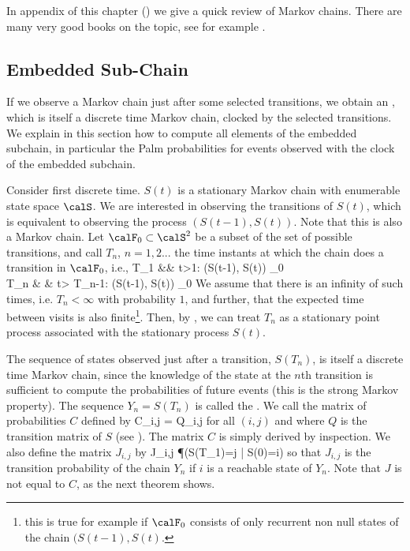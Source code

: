 In appendix of this chapter () we give a quick
review of Markov chains. There are many very good books on the
topic, see for example \cite{Cinlar,ycart-2000,bremaud1999mcg}.


\subsection{Embedded Sub-Chain}

If we observe a Markov chain just after some selected transitions,
we obtain an , which is itself a discrete
time Markov chain, clocked by the selected transitions. We explain
in this section how to compute all elements of the embedded
subchain, in particular the Palm probabilities for events observed
with the clock of the embedded subchain.

Consider first discrete time.  $S(t)$ is a stationary Markov
chain with enumerable state space $\calS$. We are interested in
observing the transitions of $S(t)$, which is equivalent to
observing the process $(S(t-1), S(t))$. Note that this is also
a Markov chain. Let $\calF_0 \subset \calS^2$ be a subset of
the set of possible transitions, and call $T_n$, $n=1,2...$ the
time instants at which the chain does a transition in
$\calF_0$, i.e.,
   \bearn
   T_1 &\eqdef& \inf\lc t>1: (S(t-1), S(t)) \in \calF_0 \rc
   \\
   T_n & \eqdef & \inf\lc t> T_{n-1}: (S(t-1), S(t)) \in \calF_0 \rc
   \eearn
We assume that there is an infinity of such times, i.e. $T_n <
\infty$ with probability $1$, and further, that the expected
time between visits is also finite\footnote{this is true for
example if $\calF_0$ consists of only recurrent non null states
of the chain $(S(t-1), S(t)$. }. Then, by
, we can treat $T_n$ as a stationary
point process associated with the stationary process $S(t)$.

The sequence of states observed just after a transition,
$S(T_n)$, is itself a discrete time Markov chain, since the
knowledge of the state at the $n$th transition is sufficient to
compute the probabilities of future events (this is the strong
Markov property). The sequence $Y_n=S(T_n)$ is called the
. We call  the matrix of probabilities $C$ defined by
 \ben
 C_{i,j} = Q_{i,j} 
 \een for all $(i,j)$ and where $Q$ is the transition matrix of $S$
 (see ). The matrix $C$ is simply derived by
 inspection.
%
 We also define the matrix $J_{i,j}$
 by
 \ben
 J_{i,j} \eqdef \P(S(T_1)=j | S(0)=i)
 \een
so that $J_{i,j}$ is the transition probability of the chain
$Y_n$ if $i$ is a reachable state of $Y_n$. Note that $J$ is
not equal to $C$, as the next theorem shows.

